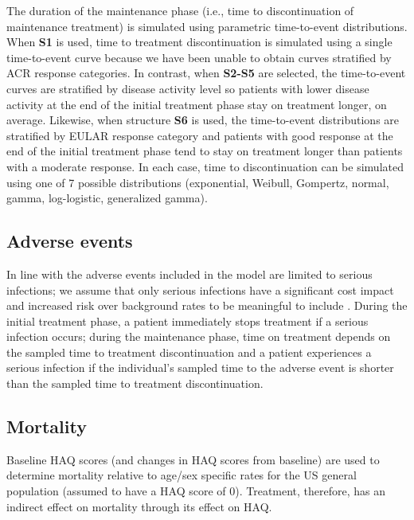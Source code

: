 \documentclass[11pt,final,fleqn]{article}\usepackage[]{graphicx}\usepackage[]{color}
\theoremstyle{plain}
\begin{document}
The duration of the maintenance phase (i.e., time to discontinuation of maintenance treatment) is simulated using parametric time-to-event distributions. When \textbf{S1} is used, time to treatment discontinuation is simulated using a single time-to-event curve because we have been unable to obtain curves stratified by ACR response categories. In contrast, when \textbf{S2-S5} are selected, the time-to-event curves are stratified by disease activity level so patients with lower disease activity at the end of the initial treatment phase stay on treatment longer, on average. Likewise, when structure \textbf{S6} is used, the time-to-event distributions are stratified by EULAR response category and patients with good response at the end of the initial treatment phase tend to stay on treatment longer than patients with a moderate response. In each case, time to discontinuation can be simulated using one of 7 possible distributions (exponential, Weibull, Gompertz, normal, gamma, log-logistic, generalized gamma).

\subsection{Adverse events}
In line with \citet{stevenson2016adalimumab} the adverse events included in the model are limited to serious infections; we assume that only serious infections have a significant cost impact and increased risk over background rates to be meaningful to include \citep{ramiro2017safety}. During the initial treatment phase, a patient immediately stops treatment if a serious infection occurs; during the maintenance phase, time on treatment depends on the sampled time to treatment discontinuation and a patient experiences a serious infection if the individual's sampled time to the adverse event is shorter than the sampled time to treatment discontinuation. 

\subsection{Mortality}
Baseline HAQ scores (and changes in HAQ scores from baseline) are used to determine mortality relative to age/sex specific rates for the US general population (assumed to have a HAQ score of 0). Treatment, therefore, has an indirect effect on mortality through its effect on HAQ. 
\end{document}
